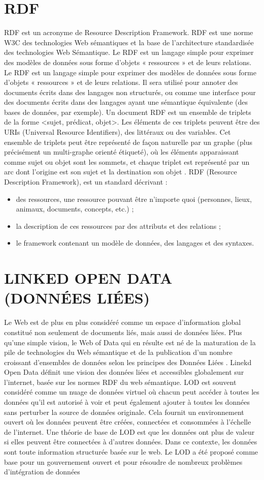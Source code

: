\documentclass[12pt]{report}
\begin{document}
\section{RDF}
RDF est un acronyme de Resource Description Framework. RDF est une norme W3C des technologies Web sémantiques et la base de l’architecture standardisée des technologies Web Sémantique. Le RDF est un langage simple pour exprimer des modèles de données sous forme d'objets « ressources » et de leurs relations.
Le RDF est un langage simple pour exprimer des
modèles de données sous forme d'objets « ressources » et de leurs relations. Il sera utilisé pour annoter des documents écrits
dans des langages non structurés, ou comme une interface pour des documents écrits dans des langages ayant une
sémantique équivalente (des bases de données, par exemple).
Un document RDF est un ensemble de triplets de la forme <sujet, prédicat, objet>. Les éléments de ces triplets peuvent être
des URIs (Universal Resource Identifiers), des littéraux ou des variables. Cet ensemble de triplets peut être représenté de façon
naturelle par un graphe (plus précisément un multi-graphe orienté étiqueté), où les éléments apparaissant comme sujet ou objet
sont les sommets, et chaque triplet est représenté par un arc dont l’origine est son sujet et la destination son objet .\cite{SEMANTCWEB}
RDF (Resource Description Framework), est un standard décrivant :
\begin{itemize}
 \item des ressources, une ressource pouvant être n'importe quoi (personnes, lieux, animaux, documents,
concepts, etc.) ;
\item la description de ces ressources par des attributs et des relations ;
\item le framework contenant un modèle de données, des langages et des syntaxes.
\end{itemize}
\section{LINKED OPEN DATA (DONNÉES LIÉES)}
Le Web est de plus en plus considéré comme un espace d’information global constitué non seulement de documents liés, mais aussi de données liées. Plus qu’une simple vision, le Web of Data qui en résulte est né de la maturation de la pile de technologies du Web sémantique et de la publication d’un nombre croissant d’ensembles de données selon les principes des Données Liées
.\cite{LDOW}
Linekd Open Data définit une vision des données liées et accessibles globalement sur l'internet, basée sur
les normes RDF du web sémantique. LOD est souvent considéré comme un nuage de données virtuel où
chacun peut accéder à toutes les données qu'il est autorisé à voir et peut également ajouter à toutes les
données sans perturber la source de données originale. Cela fournit un environnement ouvert où les
données peuvent être créées, connectées et consommées à l'échelle de l'internet. Une théorie de base de
LOD est que les données ont plus de valeur si elles peuvent être connectées à d'autres données. Dans ce
contexte, les données sont toute information structurée basée sur le web.
Le LOD a été proposé comme base pour un gouvernement ouvert et pour résoudre de nombreux
problèmes d'intégration de données
\end{document}
